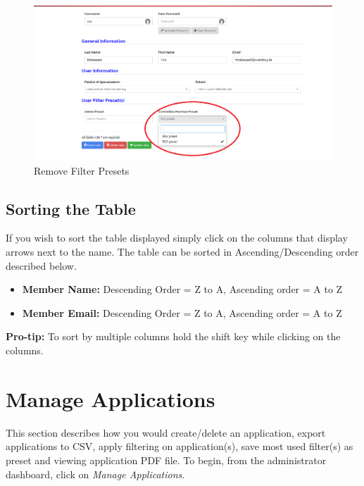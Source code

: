 \documentclass[fontsize=12pt,paper=letter,twoside]{scrartcl}
\begin{document}
\begin{figure}[!htb]
\begin{center}
\includegraphics[width=.99\textwidth]{images/mu/remove_preset.png}
\end{center}
\caption{Remove Filter Presets}
\label{fig:remove_preset}
\end{figure}


\subsection{Sorting the Table}
If you wish to sort the table displayed simply click on the columns that display arrows next to the name. The table can be sorted in Ascending/Descending order described below.

\begin{itemize}
\item \textbf{Member Name:} Descending Order = Z to A, Ascending order = A to Z
\item \textbf{Member Email:} Descending Order = Z to A, Ascending order = A to Z
\end{itemize}

\textbf{Pro-tip:} To sort by multiple columns hold the shift key while clicking on the columns.


\newpage
\clearpage
\section{Manage Applications} \label{m_appls}
This section describes how you would create/delete an application, export applications to CSV, apply filtering on application(s), save most used filter(s) as preset and viewing application PDF file. To begin, from the administrator dashboard, click on \emph{Manage Applications}.
\end{document}
